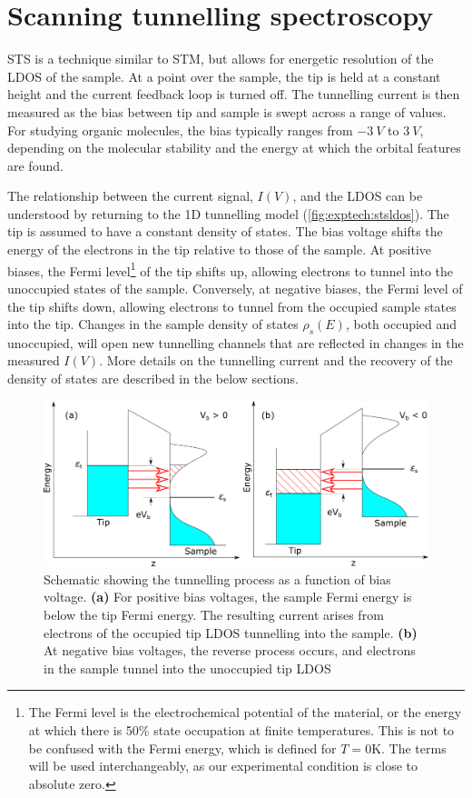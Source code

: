 \section{Scanning tunnelling spectroscopy}
\label{sec:exptech:sts}

\Acf{STS} is a technique similar to \ac{STM}, but allows for energetic resolution of the \ac{LDOS} of the sample. At a point over the sample, the tip is held at a constant height and the current feedback loop is turned off. The tunnelling current is then measured as the bias between tip and sample is swept across a range of values. For studying organic molecules, the bias typically ranges from $\SI{-3}{V}$ to $\SI{3}{V}$, depending on the molecular stability and the energy at which the orbital features are found.

The relationship between the current signal, $I(V)$, and the \ac{LDOS} can be understood by returning to the \ac{1D} tunnelling model (\autoref{fig:exptech:stsldos}). The tip is assumed to have a constant density of states. The bias voltage shifts the energy of the electrons in the tip relative to those of the sample. At positive biases, the Fermi level\footnote{The Fermi level is the electrochemical potential of the material, or the energy at which there is 50\% state occupation at finite temperatures. This is not to be confused with the Fermi energy, which is defined for $T=0$K. The terms will be used interchangeably, as our experimental condition is close to absolute zero.} of the tip shifts up, allowing electrons to tunnel into the unoccupied states of the sample. Conversely, at negative biases, the Fermi level of the tip shifts down, allowing electrons to tunnel from the occupied sample states into the tip. Changes in the sample density of states $\rho_s(E)$, both occupied and unoccupied, will open new tunnelling channels that are reflected in changes in the measured $I(V)$. More details on the tunnelling current and the recovery of the density of states are described in the below sections.

\begin{figure} [h]
    \centering
    \includegraphics[width=\textwidth]{pictures/sts_ldos.png}
    \caption{Schematic showing the tunnelling process as a function of bias voltage. \textbf{(a)} For positive bias voltages, the sample Fermi energy is below the tip Fermi energy. The resulting current arises from electrons of the occupied tip LDOS tunnelling into the sample. \textbf{(b)} At negative bias voltages, the reverse process occurs, and electrons in the sample tunnel into the unoccupied tip LDOS}
    \label{fig:exptech:stsldos}
\end{figure}

